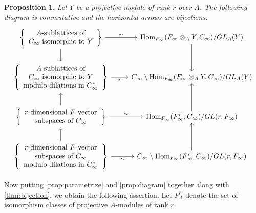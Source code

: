 \documentclass[12pt,a4paper]{article}
\theoremstyle{plain}
\newtheorem{proposition}{Proposition}[section]
\theoremstyle{definition}
\theoremstyle{remark}
\DeclareMathOperator{\Hom}{Hom}
\providecommand{\Hom}{\operatorname{Hom}}
\begin{document}
\begin{proposition}
\label{prop:diagram}
Let $Y$ be a projective module of rank $r$ over $A$. The following diagram is commutative and the horizontal arrows are bijections:
\[
\begin{tikzcd}
\left\{\begin{array}{c}
A\text{-sublattices of} \\
C_\infty \text{ isomorphic to } Y
\end{array}\right\} \arrow[r, "\sim"] \arrow[d] & \Hom_{F_\infty}(F_\infty \otimes_A Y, C_\infty)/GL_A(Y) \arrow[d] \\
\left\{\begin{array}{c}
A\text{-sublattices of} \\
C_\infty \text{ isomorphic to } Y \\
\text{modulo dilations in } C_\infty^*
\end{array}\right\} \arrow[r, "\sim"'] & C_\infty \setminus \Hom_{F_\infty}(F_\infty \otimes_A Y, C_\infty)/GL_A(Y) \\
\left\{\begin{array}{c}
r\text{-dimensional } F\text{-vector} \\
\text{subspaces of } C_\infty
\end{array}\right\} \arrow[r, "\sim"] \arrow[u] & \Hom_{F_\infty}(F_\infty^r, C_\infty)/GL(r, F_\infty) \arrow[u] \\
\left\{\begin{array}{c}
r\text{-dimensional } F\text{-vector} \\
\text{subspaces of } C_\infty \\
\text{modulo dilations in } C_\infty^*
\end{array}\right\} \arrow[r, "\sim"'] \arrow[u] & C_\infty \setminus \Hom_{F_\infty}(F_\infty^r, C_\infty)/GL(r, F_\infty) \arrow[u]
\end{tikzcd}
\]
\end{proposition}

Now putting \eqref{prop:parametrize} and \eqref{prop:diagram} together along with \eqref{thm:bijection}, we obtain the following assertion. Let $P_A^r$ denote the set of isomorphism classes of projective $A$-modules of rank $r$.
\end{document}
